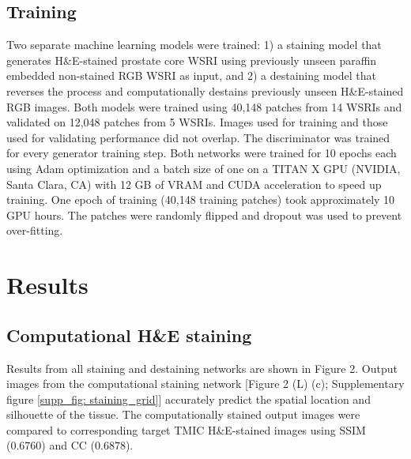 \documentclass[10pt, conference, compsocconf]{IEEEtran}
\begin{document}
\subsection{Training}
Two separate machine learning models were trained: 1) a staining model that generates H\&E-stained prostate core WSRI using previously unseen paraffin embedded non-stained RGB WSRI as input, and 2) a destaining model that reverses the process and computationally destains previously unseen H\&E-stained RGB images. Both models were trained using 40,148 patches from 14 WSRIs and validated on 12,048 patches from 5 WSRIs. Images used for training and those used for validating performance did not overlap. The discriminator was trained for every generator training step. Both networks were trained for 10 epochs each using Adam optimization and a batch size of one on a TITAN X GPU (NVIDIA, Santa Clara, CA) with 12 GB of VRAM and CUDA acceleration to speed up training. One epoch of training (40,148 training patches) took approximately 10 GPU hours. The patches were randomly flipped and dropout was used to prevent over-fitting.


\section{Results}

\subsection{Computational H\&E staining}
Results from all staining and destaining networks are shown in Figure 2. Output images from the computational staining network [Figure 2 (L) (c); Supplementary figure \ref{supp_fig: staining_grid}] accurately predict the spatial location and silhouette of the tissue. The computationally stained output images were compared to corresponding target TMIC H\&E-stained images using SSIM (0.6760) and CC (0.6878).

\end{document}
